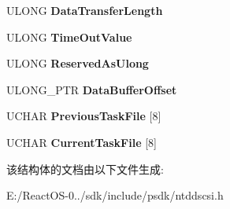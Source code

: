 \begin{DoxyCompactItemize}
U\+L\+O\+NG {\bfseries Data\+Transfer\+Length}
\item 
\mbox{\label{struct___a_t_a___p_a_s_s___t_h_r_o_u_g_h___e_x_a278a7b8b58315eed559d3f66aac35e86}} 
U\+L\+O\+NG {\bfseries Time\+Out\+Value}
\item 
\mbox{\label{struct___a_t_a___p_a_s_s___t_h_r_o_u_g_h___e_x_ab7dd61dfa4318943e2f43bb6ba9a7b26}} 
U\+L\+O\+NG {\bfseries Reserved\+As\+Ulong}
\item 
\mbox{\label{struct___a_t_a___p_a_s_s___t_h_r_o_u_g_h___e_x_a8d4529b228f8c26057c72cba7c78e3ae}} 
U\+L\+O\+N\+G\+\_\+\+P\+TR {\bfseries Data\+Buffer\+Offset}
\item 
\mbox{\label{struct___a_t_a___p_a_s_s___t_h_r_o_u_g_h___e_x_a52f74711be04742c8b1034ce449a8aff}} 
U\+C\+H\+AR {\bfseries Previous\+Task\+File} \mbox{[}8\mbox{]}
\item 
\mbox{\label{struct___a_t_a___p_a_s_s___t_h_r_o_u_g_h___e_x_a152f51ee291885ecb89420185b29ca22}} 
U\+C\+H\+AR {\bfseries Current\+Task\+File} \mbox{[}8\mbox{]}
\end{DoxyCompactItemize}


该结构体的文档由以下文件生成\+:\begin{DoxyCompactItemize}
\item 
E\+:/\+React\+O\+S-\/0../sdk/include/psdk/ntddscsi.\+h\end{DoxyCompactItemize}
